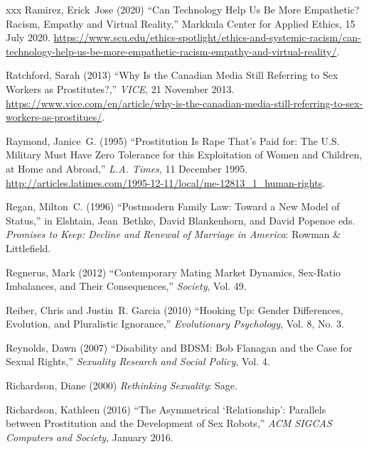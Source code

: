 \documentclass[]{jlreq} \usepackage{mystyle}
\begin{document}
\begin{thebibliography}{xxx}
Ramirez, Erick~Jose (2020) ``Can Technology Help Us Be More Empathetic? Racism,
  Empathy and Virtual Reality,'' Markkula Center for Applied Ethics, 15 July
  2020.
  \url{https://www.scu.edu/ethics-spotlight/ethics-and-systemic-racism/can-technology-help-us-be-more-empathetic-racism-empathy-and-virtual-reality/}.

Ratchford, Sarah (2013) ``Why Is the Canadian Media Still Referring to Sex
  Workers as Prostitutes?,'' \emph{VICE}, 21 November 2013.
  \url{https://www.vice.com/en/article/why-is-the-canadian-media-still-referring-to-sex-workers-as-prostitues/}.

Raymond, Janice~G. (1995) ``Prostitution Is Rape That's Paid for: The U.S.
  Military Must Have Zero Tolerance for this Exploitation of Women and
  Children, at Home and Abroad,'' \emph{L.A. Times}, 11 December 1995.
  \url{http://articles.latimes.com/1995-12-11/local/me-12813_1_human-rights}.

Regan, Milton~C. (1996) ``Postmodern Family Law: Toward a New Model of
  Status,'' in Elshtain, Jean~Bethke, David Blankenhorn, and David Popenoe eds.
    \textit{ Promises to Keep: Decline and Renewal of Marriage in America}:
  Rowman \& Littlefield.

Regnerus, Mark (2012) ``Contemporary Mating Market Dynamics, Sex-Ratio
  Imbalances, and Their Consequences,'' \textit{ Society}, Vol. 49.

Reiber, Chris and Justin~R. Garcia (2010) ``Hooking Up: Gender Differences,
  Evolution, and Pluralistic Ignorance,'' \textit{ Evolutionary Psychology},
  Vol. 8, No. 3.

Reynolds, Dawn (2007) ``Disability and BDSM: Bob Flanagan and the Case for
  Sexual Rights,'' \textit{ Sexuality Research and Social Policy}, Vol. 4.

Richardson, Diane (2000)  \textit{ Rethinking Sexuality}: Sage.

Richardson, Kathleen (2016) ``The Asymmetrical `Relationship': Parallels
  between Prostitution and the Development of Sex Robots,'' \emph{ACM SIGCAS
  Computers and Society}, January 2016.


\end{thebibliography}
\end{document}
